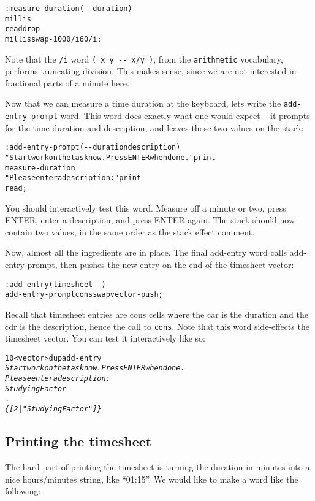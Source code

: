 \documentclass[english]{article}
\begin{document}
\begin{alltt}
: measure-duration ( -{}- duration )
    millis
    read drop
    millis swap - 1000 /i 60 /i ;
\end{alltt}
Note that the \texttt{/i} word \texttt{( x y -{}- x/y )}, from the
\texttt{arithmetic} vocabulary, performs truncating division. This
makes sense, since we are not interested in fractional parts of a
minute here.

Now that we can measure a time duration at the keyboard, lets write
the \texttt{add-entry-prompt} word. This word does exactly what one
would expect -- it prompts for the time duration and description,
and leaves those two values on the stack:

\begin{alltt}
: add-entry-prompt ( -{}- duration description )
    "Start work on the task now. Press ENTER when done." print
    measure-duration
    "Please enter a description:" print
    read ;
\end{alltt}
You should interactively test this word. Measure off a minute or two,
press ENTER, enter a description, and press ENTER again. The stack
should now contain two values, in the same order as the stack effect
comment.

Now, almost all the ingredients are in place. The final add-entry
word calls add-entry-prompt, then pushes the new entry on the end
of the timesheet vector:

\begin{alltt}
: add-entry ( timesheet -{}- )
    add-entry-prompt cons swap vector-push ;
\end{alltt}
Recall that timesheet entries are cons cells where the car is the
duration and the cdr is the description, hence the call to \texttt{cons}.
Note that this word side-effects the timesheet vector. You can test
it interactively like so:

\begin{alltt}
10 <vector> dup add-entry
\emph{Start work on the task now. Press ENTER when done.}
\emph{Please enter a description:}
\emph{Studying Factor}
.
\emph{\{ {[} 2 | "Studying Factor" {]} \}}
\end{alltt}
\subsection{Printing the timesheet}

The hard part of printing the timesheet is turning the duration in
minutes into a nice hours/minutes string, like {}``01:15''. We would
like to make a word like the following:
\end{document}
